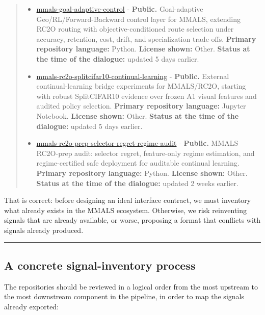 \begin{quote}
\begin{itemize}
\item
  \href{https://github.com/gharbonnier78/mmals-goal-adaptive-control}{mmals-goal-adaptive-control} - \textbf{Public.} Goal-adaptive Geo/RL/Forward-Backward control layer for MMALS, extending RC2O routing with objective-conditioned route selection under accuracy, retention, cost, drift, and specialization trade-offs. \textbf{Primary repository language:} Python. \textbf{License shown:} Other. \textbf{Status at the time of the dialogue:} updated 5 days earlier.
\item
  \href{https://github.com/gharbonnier78/mmals-rc2o-splitcifar10-continual-learning}{mmals-rc2o-splitcifar10-continual-learning} - \textbf{Public.} External continual-learning bridge experiments for MMALS/RC2O, starting with robust SplitCIFAR10 evidence over frozen A1 visual features and audited policy selection. \textbf{Primary repository language:} Jupyter Notebook. \textbf{License shown:} Other. \textbf{Status at the time of the dialogue:} updated 5 days earlier.
\item
  \href{https://github.com/gharbonnier78/mmals-rc2o-prep-selector-regret-regime-audit}{mmals-rc2o-prep-selector-regret-regime-audit} - \textbf{Public.} MMALS RC2O-prep audit: selector regret, feature-only regime estimation, and regime-certified safe deployment for auditable continual learning. \textbf{Primary repository language:} Python. \textbf{License shown:} Other. \textbf{Status at the time of the dialogue:} updated 2 weeks earlier.
\end{itemize}
\end{quote}

That is correct: before designing an ideal interface contract, we must inventory what already exists in the MMALS ecosystem. Otherwise, we risk reinventing signals that are already available, or worse, proposing a format that conflicts with signals already produced.

\begin{center}\rule{0.5\linewidth}{0.5pt}\end{center}

\subsection{A concrete signal-inventory process}\label{a-concrete-signal-inventory-process}

The repositories should be reviewed in a logical order from the most upstream to the most downstream component in the pipeline, in order to map the signals already exported:

